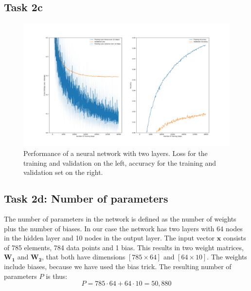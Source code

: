 \documentclass{article}
\begin{document}
\subsection{Task 2c}

\begin{figure}[H]
    \centering
    \includegraphics[width=\textwidth]{Assignments/Assignment_2/plots/task2abc/task2c_train_loss.png}
    \caption{Performance of a neural network with two layers. Loss for the training and validation on the left, accuracy for the training and validation set on the right.}
    \label{fig:task2}
\end{figure}


\subsection{Task 2d: Number of parameters}
The number of parameters in the network is defined as the number of weights plus the number of biases. In our case the network has two layers with 64 nodes in the hidden layer and 10 nodes in the output layer. The input vector $\boldsymbol{x}$ consists of 785 elements, 784 data points and 1 bias. This results in two weight matrices, $\mathbf{W_1}$ and $\mathbf{W_2}$, that both have dimensions $[785\times64]$ and $[64\times10]$. The weights include biases, because we have used the bias trick. The resulting number of parameters $P$ is thus:
\begin{equation}
    P = 785\cdot64 + 64\cdot 10 = 50,880 
\end{equation}
\end{document}
